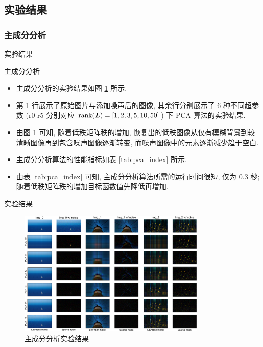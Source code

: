 \documentclass{beamer}
\begin{document}
\subsection{实验结果}

\subsubsection{主成分分析}

\begin{frame}{实验结果}
  \begin{block}{主成分分析}
    \begin{itemize}
      \item 主成分分析的实验结果如图 \ref{fig:results_pca}  所示.
      \item 第 1 行展示了原始图片与添加噪声后的图像, 其余行分别展示了 6 种不同超参数 (\textsf{r0}-\textsf{r5} 分别对应 $\operatorname{rank}(\bm{L})=[1,2,3,5,10,50]$) 下 PCA 算法的实验结果.
      \item 由图 \ref{fig:results_pca} 可知, 随着低秩矩阵秩的增加, 恢复出的低秩图像从仅有模糊背景到较清晰图像再到包含噪声图像逐渐转变, 而噪声图像中的元素逐渐减少趋于空白.
      \item 主成分分析算法的性能指标如表 \ref{tab:pca_index} 所示.
      \item 由表 \ref{tab:pca_index} 可知, 主成分分析算法所需的运行时间很短, 仅为 0.3 秒; 随着低秩矩阵秩的增加目标函数值先降低再增加.
    \end{itemize}
  \end{block}
\end{frame}

\begin{frame}{实验结果}
  \begin{figure}[H]
    \centering
    \includegraphics[height=6cm]{pca_total.pdf}
    \caption{主成分分析实验结果}
    \label{fig:results_pca}
  \end{figure}
\end{frame}
\end{document}
